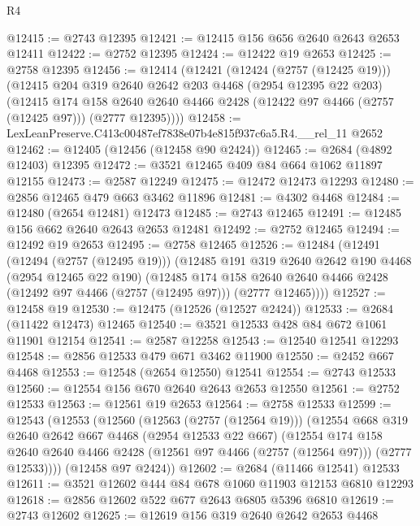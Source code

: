 \begin{lexlean}{R4}
\begin{coremodule}
@12415 := @2743 @12395
@12421 := @12415 @156 @656 @2640 @2643 @2653 @12411
@12422 := @2752 @12395
@12424 := @12422 @19 @2653
@12425 := @2758 @12395
@12456 := @12414
    (@12421
      (@12424 (@2757 (@12425 @19)))
      (@12415
        @204
        @319
        @2640
        @2642
        @203
        @4468
        (@2954 @12395 @22 @203)
        (@12415
          @174
          @158
          @2640
          @2640
          @4466
          @2428
          (@12422 @97 @4466 (@2757 (@12425 @97)))
          (@2777 @12395))))
@12458 := LexLeanPreserve.C413c00487ef7838e07b4e815f937c6a5.R4.__rel_11 @2652
@12462 := @12405 (@12456 (@12458 @90 @2424))
@12465 := @2684 (@4892 @12403) @12395
@12472 := @3521 @12465 @409 @84 @664 @1062 @11897 @12155
@12473 := @2587 @12249
@12475 := @12472 @12473 @12293
@12480 := @2856 @12465 @479 @663 @3462 @11896
@12481 := @4302 @4468
@12484 := @12480 (@2654 @12481) @12473
@12485 := @2743 @12465
@12491 := @12485 @156 @662 @2640 @2643 @2653 @12481
@12492 := @2752 @12465
@12494 := @12492 @19 @2653
@12495 := @2758 @12465
@12526 := @12484
    (@12491
      (@12494 (@2757 (@12495 @19)))
      (@12485
        @191
        @319
        @2640
        @2642
        @190
        @4468
        (@2954 @12465 @22 @190)
        (@12485
          @174
          @158
          @2640
          @2640
          @4466
          @2428
          (@12492 @97 @4466 (@2757 (@12495 @97)))
          (@2777 @12465))))
@12527 := @12458 @19
@12530 := @12475 (@12526 (@12527 @2424))
@12533 := @2684 (@11422 @12473) @12465
@12540 := @3521 @12533 @428 @84 @672 @1061 @11901 @12154
@12541 := @2587 @12258
@12543 := @12540 @12541 @12293
@12548 := @2856 @12533 @479 @671 @3462 @11900
@12550 := @2452 @667 @4468
@12553 := @12548 (@2654 @12550) @12541
@12554 := @2743 @12533
@12560 := @12554 @156 @670 @2640 @2643 @2653 @12550
@12561 := @2752 @12533
@12563 := @12561 @19 @2653
@12564 := @2758 @12533
@12599 := @12543
    (@12553
      (@12560
        (@12563 (@2757 (@12564 @19)))
        (@12554
          @668
          @319
          @2640
          @2642
          @667
          @4468
          (@2954 @12533 @22 @667)
          (@12554
            @174
            @158
            @2640
            @2640
            @4466
            @2428
            (@12561 @97 @4466 (@2757 (@12564 @97)))
            (@2777 @12533))))
      (@12458 @97 @2424))
@12602 := @2684 (@11466 @12541) @12533
@12611 := @3521 @12602 @444 @84 @678 @1060 @11903 @12153 @6810 @12293
@12618 := @2856 @12602 @522 @677 @2643 @6805 @5396 @6810
@12619 := @2743 @12602
@12625 := @12619 @156 @319 @2640 @2642 @2653 @4468

\end{coremodule}
\end{lexlean}
